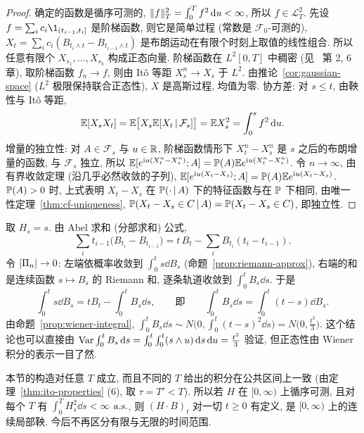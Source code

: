 \begin{proof}
确定的函数是循序可测的, $\norm{f}_T^2=\int_0^Tf^2\dd u<\infty$, 所以 $f\in\mathscr{L}^2_T$. 先设 $f=\sum_ic_i\1_{(t_{i-1},t_i]}$ 是阶梯函数, 则它是简单过程 (常数是 $\mathcal{F}_0$-可测的), $X_t=\sum_ic_i(B_{t_i\wedge t}-B_{t_{i-1}\wedge t})$ 是布朗运动在有限个时刻上取值的线性组合. 所以任意有限个 $X_{s_1},\dots,X_{s_k}$ 构成正态向量. 阶梯函数在 $L^2[0,T]$ 中稠密 (见~\cite{folland} 第 2, 6 章), 取阶梯函数 $f_n\to f$, 则由 It\^o 等距 $X^n_s\to X_s$ 于 $L^2$. 由推论~\ref{cor:gaussian-space} ($L^2$ 极限保持联合正态性), $X$ 是高斯过程, 均值为零. 协方差: 对 $s\le t$, 由鞅性与 It\^o 等距,
\[
\E[X_sX_t]=\E\big[X_s\E[X_t\,|\,\mathcal{F}_s]\big]=\E X_s^2=\int_0^sf^2\dd u.
\]
增量的独立性: 对 $A\in\mathcal{F}_s$ 与 $u\in\R$, 阶梯函数情形下 $X^n_t-X^n_s$ 是 $s$ 之后的布朗增量的函数, 与 $\mathcal{F}_s$ 独立, 所以 $\E[e^{\mathrm{i}u(X^n_t-X^n_s)};A]=\P(A)\E e^{\mathrm{i}u(X^n_t-X^n_s)}$. 令 $n\to\infty$, 由有界收敛定理 (沿几乎必然收敛的子列), $\E[e^{\mathrm{i}u(X_t-X_s)};A]=\P(A)\E e^{\mathrm{i}u(X_t-X_s)}$. $\P(A)>0$ 时, 上式表明 $X_t-X_s$ 在 $\P(\cdot\,|\,A)$ 下的特征函数与在 $\P$ 下相同, 由唯一性定理~\ref{thm:cf-uniqueness}, $\P(X_t-X_s\in C\,|\,A)=\P(X_t-X_s\in C)$, 即独立性.
\end{proof}

\begin{example}\label{ex:int-sdB}
取 $H_s=s$. 由 Abel 求和 (分部求和) 公式,
\[
\sum_it_{i-1}\big(B_{t_i}-B_{t_{i-1}}\big)=t\,B_t-\sum_iB_{t_i}(t_i-t_{i-1}).
\]
令 $\abs{\Pi_n}\to0$: 左端依概率收敛到 $\int_0^ts\dd B_s$ (命题~\ref{prop:riemann-approx}), 右端的和是连续函数 $s\mapsto B_s$ 的 Riemann 和, 逐条轨道收敛到 $\int_0^tB_s\dd s$. 于是
\[
\int_0^ts\dd B_s=tB_t-\int_0^tB_s\dd s,\qquad\text{即}\qquad\int_0^tB_s\dd s=\int_0^t(t-s)\dd B_s.
\]
由命题~\ref{prop:wiener-integral}, $\int_0^tB_s\dd s\sim N\big(0,\int_0^t(t-s)^2\dd s\big)=N\big(0,\frac{t^3}{3}\big)$. 这个结论也可以直接由 $\Var\int_0^tB_s\dd s=\int_0^t\int_0^t(s\wedge u)\dd s\dd u=\frac{t^3}{3}$ 验证, 但正态性由 Wiener 积分的表示一目了然.
\end{example}

\begin{remark}
本节的构造对任意 $T$ 成立, 而且不同的 $T$ 给出的积分在公共区间上一致 (由定理~\ref{thm:ito-properties} (6), 取 $\tau=T'<T$). 所以若 $H$ 在 $[0,\infty)$ 上循序可测, 且对每个 $T$ 有 $\int_0^TH_s^2\dd s<\infty$ $\as$, 则 $(H\cdot B)_t$ 对一切 $t\ge0$ 有定义, 是 $[0,\infty)$ 上的连续局部鞅. 今后不再区分有限与无限的时间范围.
\end{remark}

